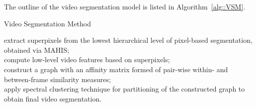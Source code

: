 The outline of the video segmentation model is listed in Algorithm~\ref{alg::VSM}. 
\incmargin{1em} 
\begin{algorithm}[htbp]
\caption{Video Segmentation Method}
\label{alg::VSM}
\dontprintsemicolon
\BlankLine
\Indm  
{}
\Indp
\BlankLine
extract superpixels from the lowest hierarchical level of pixel-based segmentation, obtained via MAHIS;\\
compute low-level video features based on superpixels;\\ 
construct a graph with an affinity matrix formed of pair-wise within- and between-frame similarity measures;\\
apply spectral clustering technique for partitioning of the constructed graph to obtain final video segmentation.
\BlankLine
\Indm  
\end{algorithm}
\decmargin{1em}

